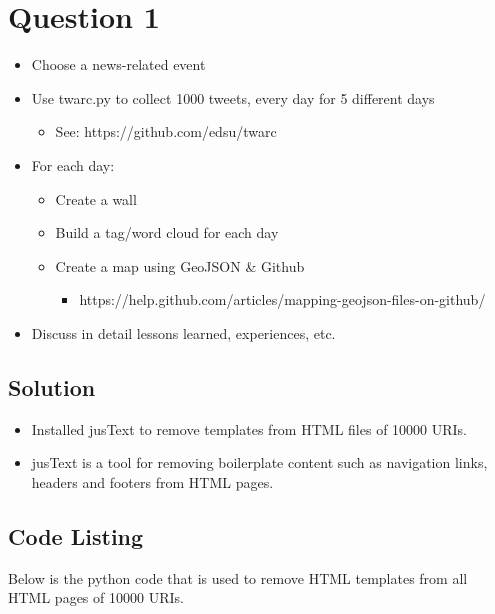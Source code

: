 


\section{Question 1}
\label{part1}

\begin{itemize}
\item Choose a news-related event
\item Use twarc.py to collect 1000 tweets, every day for 5 different days
\begin{itemize}
\item See: https://github.com/edsu/twarc
\end{itemize}
\item For each day:
\begin{itemize}
\item Create a wall
\item Build a tag/word cloud for each day
\item Create a map using GeoJSON & Github
\begin{itemize}
\item https://help.github.com/articles/mapping-geojson-files-on-github/ 
\end{itemize}
\end{itemize}
\item Discuss in detail lessons learned, experiences, etc.
\end{itemize}
\subsection{Solution}

\begin{itemize}
	\item Installed jusText\cite{jusText} to remove templates from HTML files of 10000 URIs.
	\item jusText is a tool for removing boilerplate content such as navigation links, headers and footers from HTML pages.
\end{itemize}

 \subsection{Code Listing}
Below is the python code that is used to remove HTML templates from all HTML pages of 10000 URIs.



